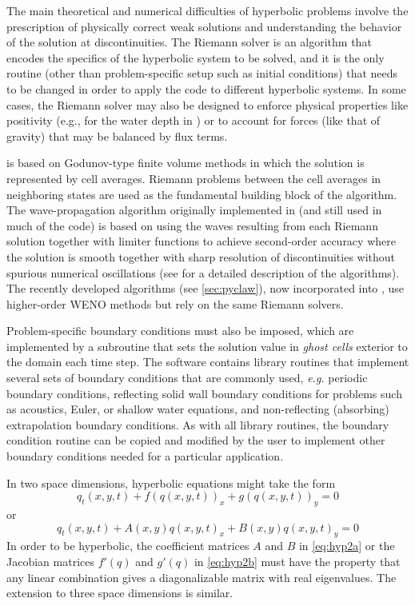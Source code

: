 The main theoretical and numerical difficulties of hyperbolic problems
involve the prescription of physically correct weak solutions and
understanding the behavior of the solution at discontinuities.  The
Riemann solver is an algorithm that encodes the specifics of the
hyperbolic system to be solved, and it is the only routine (other than
problem-specific setup such as initial conditions) 
that needs to be changed in order to apply the
code to different hyperbolic systems.  In some cases, the Riemann
solver may also be designed to enforce physical properties like
positivity (e.g., for the water depth in \geoclaw) or to account for
forces (like that of gravity) that may be balanced by flux terms.

\clawpack is based on Godunov-type finite volume methods in which
the solution is represented by cell averages.  Riemann problems
between the cell averages in neighboring states are used as the
fundamental building block of the algorithm.
The wave-propagation algorithm originally
implemented in \clawpack (and still used in much of the code) is based on
using the waves resulting from each Riemann solution together with limiter
functions to achieve second-order accuracy where the solution is smooth
together with sharp resolution of discontinuities without spurious numerical
oscillations (see \cite{rjl:fvmhp} for a detailed description of the
algorithms).   The recently developed \sharpclaw algorithms (see
\cref{sec:pyclaw}), now incorporated into \pyclaw, use higher-order WENO methods
but rely on the same Riemann solvers.

Problem-specific boundary conditions must also be imposed, which
are implemented by a subroutine that sets the solution value in
{\em ghost cells} exterior to the domain each time step.  The
\clawpack software contains library routines that implement several
sets of boundary conditions that are commonly used, {\em e.g.}
periodic boundary conditions, reflecting solid wall boundary
conditions for problems such as acoustics, Euler, or shallow water
equations, and non-reflecting (absorbing) extrapolation boundary
conditions.  As with all \clawpack library routines, the boundary
condition routine can be copied and modified by the user to implement
other boundary conditions needed for a particular application.

In two space dimensions, hyperbolic equations might take the form
\begin{equation}\label{eq:hyp2a}
q_t(x,y,t) + f(q(x,y,t))_x + g(q(x,y,t))_y = 0
\end{equation}
or
\begin{equation}\label{eq:hyp2b}
q_t(x,y,t) + A(x,y)q(x,y,t)_x + B(x,y)q(x,y,t)_y = 0
\end{equation}
In order to be hyperbolic, the coefficient matrices $A$ and $B$ in \cref{eq:hyp2a}
or the Jacobian matrices $f'(q)$ and $g'(q)$ in \cref{eq:hyp2b}
must have the property that any linear
combination gives a diagonalizable matrix with real eigenvalues.  The
extension to three space dimensions is similar.

